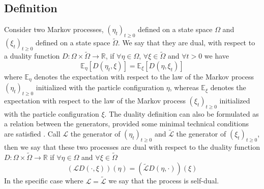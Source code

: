 \documentclass[10pt]{article}
\numberwithin{equation}{section}
\numberwithin{equation}{subsection}
\begin{document}
\subsection{Definition}
\label{def-duality}
Consider two Markov processes, $(\eta_{t})_{t\geq 0}$ defined on a state space $\Omega$ and $(\xi_{t})_{t\geq 0}$ defined on a state space $\widetilde{\Omega}$. We say that they are dual, with respect to a duality function $D:\Omega\times \widetilde{\Omega}\to \mathbb{R}$, if $\forall \eta\in\Omega$, $\forall \xi\in\widetilde{\Omega}$ and $\forall t> 0$ we have 
\begin{equation}\label{duality-expectation}
    \mathbb{E}_{\eta}\left[D(\eta_{t},\xi)\right]=\mathbb{E}_{\xi}\left[D(\eta,\xi_{t})\right]
\end{equation}
where $\mathbb{E}_{\eta}$ denotes the expectation with respect to the law of the Markov process $(\eta_{t})_{t\geq 0}$ initialized with the particle configuration $\eta$, whereas $\mathbb{E}_{\xi}$ denotes the expectation with respect to the law of the Markov process $(\xi_{t})_{t\geq 0}$ initialized with the particle configuration $\xi$.
The duality definition can also be formulated as a relation between the generators, provided some minimal technical conditions are satisfied \cite{jansen2014notion}. Call $\mathcal{L}$ the generator of $(\eta_{t})_{t\geq0}$ and $\widetilde{\mathcal{L}}$ the generator of $(\xi_{t})_{t\geq 0}$, then we say that these two processes are dual with respect to the duality function $D:\Omega\times \widetilde{\Omega}\to \mathbb{R}$ if $\forall \eta\in\Omega$ and $\forall \xi\in\widetilde{\Omega}$
\begin{equation}\label{dualityRelationGenerator}
    \left(\mathcal{L}D(\cdot,\xi)\right)(\eta)=\left(\widetilde{\mathcal{L}}D(\eta,\cdot)\right)(\xi)
\end{equation}
In the specific case where $\mathcal{L}=\widetilde{\mathcal{L}}$ we say that the process is self-dual.
\end{document}
